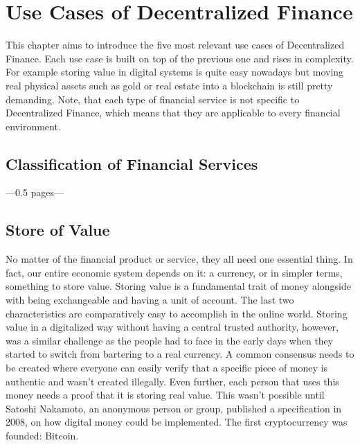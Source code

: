 \chapter{Use Cases of Decentralized Finance}
\label{cha:UseCasesDecentralizedFinance}

This chapter aims to introduce the five most relevant use cases of Decentralized Finance. Each use case is built on top of the previous one and rises in complexity. For example storing value in digital systems is quite easy nowadays but moving real physical assets such as gold or real estate into a blockchain is still pretty demanding. Note, that each type of financial service is not specific to Decentralized Finance, which means that they are applicable to every financial environment.

\section{Classification of Financial Services}
---0.5 pages---

\section{Store of Value}
No matter of the financial product or service, they all need one essential thing. In fact, our entire economic system depends on it: a currency, or in simpler terms, something to store value. Storing value is a fundamental trait of money alongside with being exchangeable and having a unit of account. The last two characteristics are comparatively easy to accomplish in the online world. Storing value in a digitalized way without having a central trusted authority, however, was a similar challenge as the people had to face in the early days when they started to switch from bartering to a real currency. A common consensus needs to be created where everyone can easily verify that a specific piece of money is authentic and wasn't created illegally. Even further, each person that uses this money needs a proof that it is storing real value. This wasn't possible until Satoshi Nakamoto, an anonymous person or group, published a specification \cite{Nakamoto2008} in 2008, on how digital money could be implemented. The first cryptocurrency was founded: Bitcoin.

